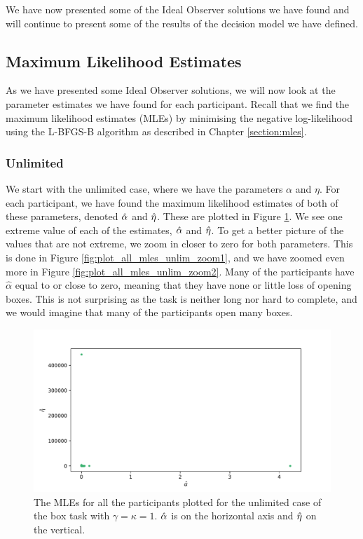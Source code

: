 We have now presented some of the Ideal Observer solutions we have found and will continue to present some of the results of the decision model we have defined. 




\subsection{Maximum Likelihood Estimates}
\label{chapter:mles}
As we have presented some Ideal Observer solutions, we will now look at the parameter estimates we have found for each participant. Recall that we find the maximum likelihood estimates (MLEs) by minimising the negative log-likelihood using the L-BFGS-B algorithm as described in Chapter \ref{section:mles}.


\subsubsection{Unlimited}
We start with the unlimited case, where we have the parameters $\alpha$ and $\eta$. For each participant, we have found the maximum likelihood estimates of both of these parameters, denoted $\hat{\alpha}$ and $\hat{\eta}$. These are plotted in Figure \ref{fig:plot_all_mles_unlim_zoom0}. We see one extreme value of each of the estimates, $\hat{\alpha}$ and $\hat{\eta}$. To get a better picture of the values that are not extreme, we zoom in closer to zero for both parameters. This is done in Figure \ref{fig:plot_all_mles_unlim_zoom1}, and we have zoomed even more in Figure \ref{fig:plot_all_mles_unlim_zoom2}. Many of the participants have $\hat{\alpha}$ equal to or close to zero, meaning that they have none or little loss of opening boxes. This is not surprising as the task is neither long nor hard to complete, and we would imagine that many of the participants open many boxes. 



\begin{figure}
    \centering
    \includegraphics[scale=0.5]{pictures/plotted_mles_unlim_gk1.pdf}
    \caption[MLEs of $\alpha$ and $\eta$, unlimited with $\gamma=\kappa=1$.]{The MLEs for all the participants plotted for the unlimited case of the box task with $\gamma=\kappa=1$. $\hat{\alpha}$ is on the horizontal axis and $\hat{\eta}$ on the vertical.}
    \label{fig:plot_all_mles_unlim_zoom0}
\end{figure}

